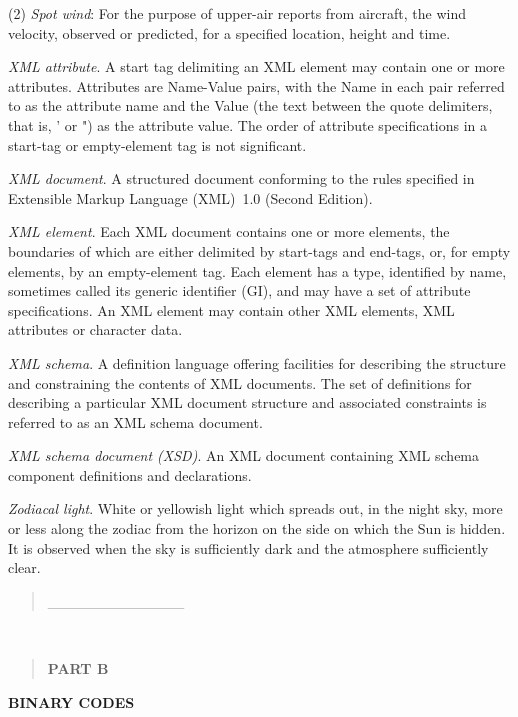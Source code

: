 (2) \emph{Spot wind}: For the purpose of upper-air reports from aircraft, the wind velocity, observed or predicted, for a specified location, height and time.

\emph{XML attribute}. A start tag delimiting an XML element may contain one or more attributes. Attributes are Name-Value pairs, with the Name in each pair referred to as the attribute name and the Value (the text between the quote delimiters, that is, ' or ") as the attribute value. The order of attribute specifications in a start-tag or empty-element tag is not significant.

\emph{XML document}. A structured document conforming to the rules specified in Extensible Markup Language (XML)~1.0 (Second Edition).

\emph{XML element}. Each XML document contains one or more elements, the boundaries of which are either delimited by start-tags and end-tags, or, for empty elements, by an empty-element tag. Each element has a type, identified by name, sometimes called its generic identifier (GI), and may have a set of attribute specifications. An XML element may contain other XML elements, XML attributes or character data.

\emph{XML schema}. A definition language offering facilities for describing the structure and constraining the contents of XML documents. The set of definitions for describing a particular XML document structure and associated constraints is referred to as an XML schema document.

\emph{XML schema document (XSD)}. An XML document containing XML schema component definitions and declarations.

\emph{Zodiacal light}. White or yellowish light which spreads out, in the night sky, more or less along the zodiac from the horizon on the side on which the Sun is hidden. It is observed when the sky is sufficiently dark and the atmosphere sufficiently clear.

\begin{quote}
\_\_\_\_\_\_\_\_\_\_\_\_\_
\end{quote}

\textbf{\\
}

\begin{quote}
\textbf{PART B}
\end{quote}

\textbf{BINARY CODES}

